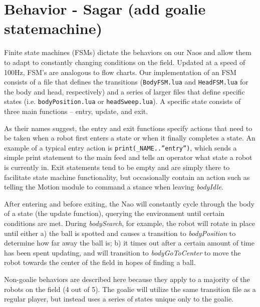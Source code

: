 \documentclass{article}
\begin{document}
\section{Behavior - Sagar (add goalie statemachine)}
	Finite state machines (FSMs) dictate the behaviors on our Naos and allow them to adapt to constantly changing conditions on the field. Updated at a speed of 100Hz, FSM's are analogous to flow charts. Our implementation of an FSM consists of a file that defines the transitions (\texttt{BodyFSM.lua} and \texttt{HeadFSM.lua} for the body and head, respectively) and a series of larger files that define specific states (i.e. \texttt{bodyPosition.lua} or \texttt{headSweep.lua}). A specific state consists of three main functions – entry, update, and exit. 

	As their names suggest, the entry and exit functions specify actions that need to be taken when a robot first enters a state or when it finally completes a state. An example of a typical entry action is \texttt{print(\_NAME..”entry”)}, which sends a simple print statement to the main feed and tells an operator what state a robot is currently in. Exit statements tend to be empty and are simply there to facilitate state machine functionality, but occasionally contain an action such as telling the Motion module to command a stance when leaving \textit{bodyIdle}.

	After entering and before exiting, the Nao will constantly cycle through the body of a state (the update function), querying the environment until certain conditions are met. During \textit{bodySearch}, for example, the robot will rotate in place until either a) the ball is spotted and causes a transition to \textit{bodyPosition} to determine how far away the ball is; b) it times out after a certain amount of time has been spent updating, and will transition to \textit{bodyGoToCenter} to move the robot towards the center of the field in hopes of finding a ball.

	Non-goalie behaviors are described here because they apply to a majority of the robots on the field (4 out of 5). The goalie will utilize the same transition file as a regular player, but instead uses a series of states unique only to the goalie.
\end{document}
